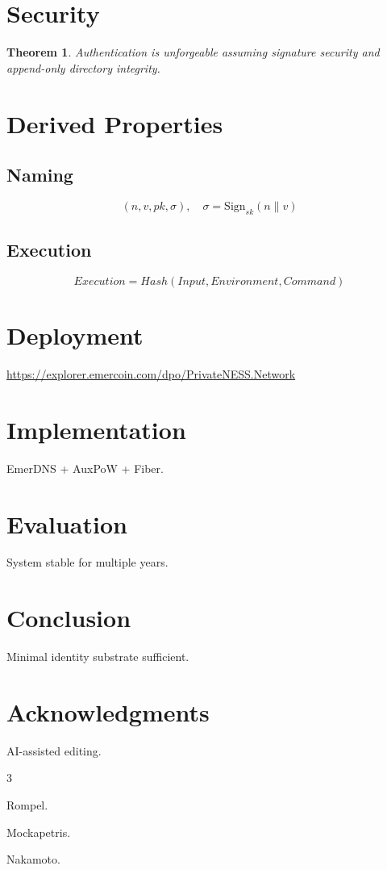 \documentclass[11pt,a4paper]{article}
\newtheorem{theorem}{Theorem}[section]
\begin{document}
\section{Security}

\begin{theorem}
Authentication is unforgeable assuming signature security and append-only directory integrity.
\end{theorem}

\section{Derived Properties}

\subsection{Naming}

\begin{equation}
(n, v, pk, \sigma), \quad \sigma = \text{Sign}_{sk}(n \parallel v)
\end{equation}

\subsection{Execution}

\begin{equation}
Execution = Hash(Input, Environment, Command)
\end{equation}

\section{Deployment}

\url{https://explorer.emercoin.com/dpo/PrivateNESS.Network}

\section{Implementation}

EmerDNS + AuxPoW + Fiber.

\section{Evaluation}

System stable for multiple years.

\section{Conclusion}

Minimal identity substrate sufficient.

\section*{Acknowledgments}

AI-assisted editing.

\begin{thebibliography}{3}

Rompel.

Mockapetris.

Nakamoto.

\end{thebibliography}
\end{document}
